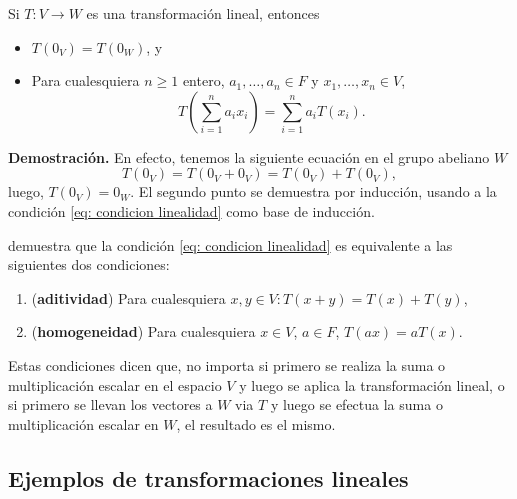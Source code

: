 \begin{obs}
Si $T: V \longrightarrow W$ es una transformación lineal, entonces
\begin{itemize}
	\item $T(0_{V}) = T(0_{W})$, y
	\item Para cualesquiera $n \geq 1$ entero, 
	$a_{1}, \ldots, a_{n} \in F$ y 
	$x_{1}, \ldots , x_{n} \in V$, 
	\[
	T \left( \sum_{i=1}^{n} a_{i}x_{i} \right) = 
	\sum_{i=1}^{n} a_{i}T(x_{i}).
	\]
\end{itemize}
\end{obs}
\noindent
\textbf{Demostración.}
En efecto, tenemos la siguiente ecuación en el grupo abeliano $W$
\[
T(0_{V}) = T(0_{V} + 0_{V}) = T(0_{V}) + T(0_{V}),
\]
luego, $T(0_{V}) = 0_{W}$. El segundo punto se demuestra
por inducción, usando a la condición \eqref{eq: condicion linealidad}
como base de inducción.
\QEDB
\vspace{0.2cm}

 demuestra que la condición
\ref{eq: condicion linealidad} es equivalente a las siguientes dos
condiciones:
\begin{enumerate}
	\item (\textbf{aditividad})
	Para cualesquiera $x, y \in V: T(x+y) = T(x) + T(y)$,
	\item (\textbf{homogeneidad}) Para cualesquiera $x \in V$, $a \in F$, 
	$T(ax) = a T(x)$.
\end{enumerate}
Estas condiciones dicen que, no importa si primero
se realiza la suma o multiplicación escalar en el espacio $V$
y luego se aplica la transformación lineal, o si primero se llevan
los vectores a $W$ via $T$ y luego se efectua la suma o 
multiplicación escalar en $W$, el resultado es el mismo.

\subsection{Ejemplos de transformaciones lineales}

